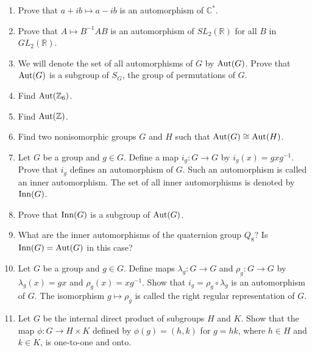 {\begin{enumerate}
\item
Prove that $a + ib \mapsto a - ib$ is an automorphism of ${\mathbb C}^*$. 
 

\item
Prove that $A \mapsto B^{-1}AB$ is an automorphism of $SL_2({\mathbb R})$
for all $B$ in $GL_2({\mathbb R})$. 
 

\item
We will denote the set of all automorphisms of $G$ by
$\operatorname{Aut}(G)$\label{noteauto}.  Prove that  $\operatorname{Aut}(G)$ is a subgroup of
$S_G$, the group of permutations of $G$. 
 

\item
Find $\operatorname{Aut}( {\mathbb Z}_6)$.
 

\item
Find $\operatorname{Aut}( {\mathbb Z})$.
 

\item
Find two nonisomorphic groups $G$ and $H$ such that $\operatorname{Aut}(G) \cong \operatorname{Aut}(
H)$. 
 

\item
Let $G$ be a group and $g \in G$. Define a map $i_g : G \rightarrow
G$\label{noteinner} 
by $i_g(x) = g x g^{-1}$.  Prove that $i_g$ defines an automorphism of
$G$.  Such an automorphism is called an {\bfi inner
automorphism}. The set of all inner
automorphisms is denoted by $\operatorname{Inn}(G)$\label{noteinneraut}. 
 

\item
Prove that $\operatorname{Inn}(G)$ is a subgroup of $\operatorname{Aut}(G)$.
 

\item
What are the inner automorphisms of the quaternion group $Q_8$? Is
$\operatorname{Inn}(G) = \operatorname{Aut}(G)$ in this case? 
 

\item
Let $G$ be a group and $g \in G$.  Define maps $\lambda_g :G
\rightarrow G$ and $\rho_g :G \rightarrow G$\label{noterightreg}
 by $\lambda_g(x) = gx$
and $\rho_g(x) = xg^{-1}$. Show that $i_g = \rho_g \circ \lambda_g$ is
an automorphism of $G$. The isomorphism $g \mapsto \rho_g$ is called
the {\bfi right regular representation\/} of $G$. 
 

\item
Let $G$ be the internal direct product of subgroups $H$ and $K$.  Show
that the map $\phi : G \rightarrow H \times K$ defined by  $\phi(g) =
(h,k)$ for $g =hk$,  where $h \in H$ and  $k \in K$, is one-to-one and
onto. 
 


\end{enumerate}}
